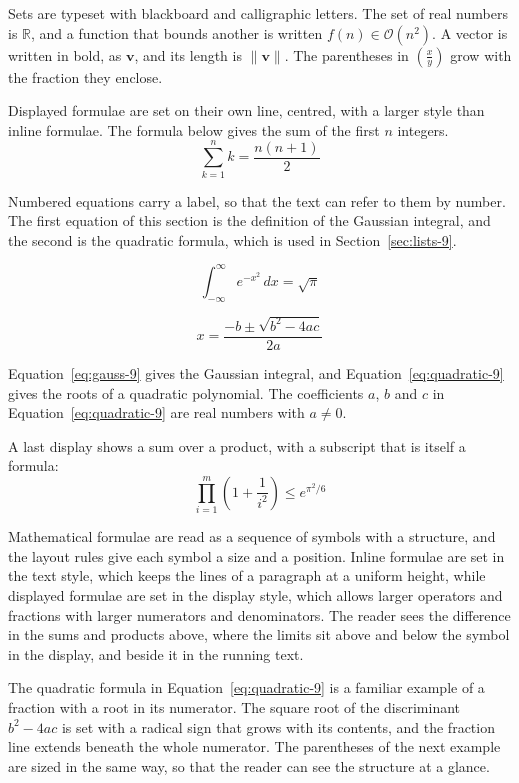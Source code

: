 \documentclass{article}
\begin{document}
Sets are typeset with blackboard and calligraphic letters. The set of real numbers is
$\mathbb{R}$, and a function that bounds another is written $f(n) \in \mathcal{O}(n^2)$.
A vector is written in bold, as $\mathbf{v}$, and its length is $\|\mathbf{v}\|$. The
parentheses in $\left( \frac{x}{y} \right)$ grow with the fraction they enclose.

Displayed formulae are set on their own line, centred, with a larger style than inline
formulae. The formula below gives the sum of the first $n$ integers.
\[
  \sum_{k=1}^{n} k = \frac{n(n+1)}{2}
\]

Numbered equations carry a label, so that the text can refer to them by number. The
first equation of this section is the definition of the Gaussian integral, and the
second is the quadratic formula, which is used in Section~\ref{sec:lists-9}.

\begin{equation}\label{eq:gauss-9}
  \int_{-\infty}^{\infty} e^{-x^{2}}\,dx = \sqrt{\pi}
\end{equation}

\begin{equation}\label{eq:quadratic-9}
  x = \frac{-b \pm \sqrt{b^{2}-4ac}}{2a}
\end{equation}

Equation~\ref{eq:gauss-9} gives the Gaussian integral, and
Equation~\ref{eq:quadratic-9} gives the roots of a quadratic polynomial. The coefficients
$a$, $b$ and $c$ in Equation~\ref{eq:quadratic-9} are real numbers with $a \neq 0$.

A last display shows a sum over a product, with a subscript that is itself a formula:
\[
  \prod_{i=1}^{m} \left( 1 + \frac{1}{i^{2}} \right) \leq e^{\pi^{2}/6}
\]

Mathematical formulae are read as a sequence of symbols with a structure, and the layout
rules give each symbol a size and a position. Inline formulae are set in the text style,
which keeps the lines of a paragraph at a uniform height, while displayed formulae are
set in the display style, which allows larger operators and fractions with larger
numerators and denominators. The reader sees the difference in the sums and products
above, where the limits sit above and below the symbol in the display, and beside it in
the running text.

The quadratic formula in Equation~\ref{eq:quadratic-9} is a familiar example of a
fraction with a root in its numerator. The square root of the discriminant
$b^{2}-4ac$ is set with a radical sign that grows with its contents, and the
fraction line extends beneath the whole numerator. The parentheses of the next example
are sized in the same way, so that the reader can see the structure at a glance.
\end{document}
